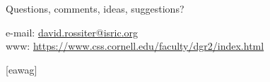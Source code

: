 \documentclass[aspectratio=169, 10pt]{beamer}
\begin{document}
  \begin{frame} 
    \frametitle{}
    \framesubtitle{}

 \begin{center}
 \vspace{0.5cm}
 \textcolor{isric_yellow}{\Large{Questions, comments, ideas, suggestions?}}
 \end{center}
 \textcolor{isric_yellow}{e-mail: \url{david.rossiter@isric.org}}
  \\
  \textcolor{isric_yellow}{www: \url{https://www.css.cornell.edu/faculty/dgr2/index.html}}
\end{frame} 



[eawag] %
\end{document}
